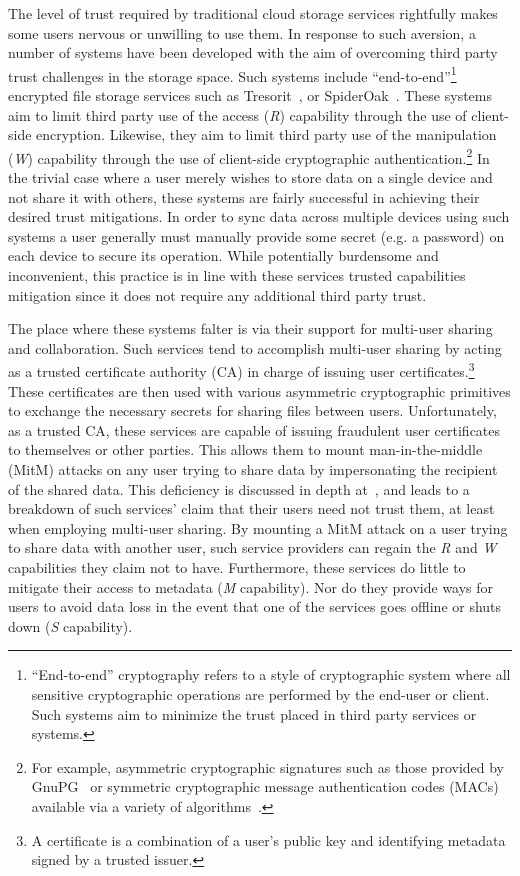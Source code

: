 The level of trust required by traditional cloud storage services
rightfully makes some users nervous or unwilling to use them. In
response to such aversion, a number of systems have been developed
with the aim of overcoming third party trust challenges in the storage
space. Such systems include ``end-to-end''\footnote{``End-to-end''
  cryptography refers to a style of cryptographic system where all
  sensitive cryptographic operations are performed by the end-user or
  client. Such systems aim to minimize the trust placed in third party
  services or systems.} encrypted file storage services such as
Tresorit~\cite{tresorit}, or SpiderOak~\cite{spideroak}. These systems
aim to limit third party use of the access (\emph{R}) capability
through the use of client-side encryption. Likewise, they aim to limit
third party use of the manipulation (\emph{W}) capability through the
use of client-side cryptographic authentication.\footnote{For example,
  asymmetric cryptographic signatures such as those provided by
  GnuPG~\cite{gnupg} or symmetric cryptographic message authentication
  codes (MACs) available via a variety of
  algorithms~\cite{dworkin2005, dworkin2008, dworkin2007}.}  In the
trivial case where a user merely wishes to store data on a single
device and not share it with others, these systems are fairly
successful in achieving their desired trust mitigations. In order to
sync data across multiple devices using such systems a user generally
must manually provide some secret (e.g. a password) on each device to
secure its operation. While potentially burdensome and inconvenient,
this practice is in line with these services trusted capabilities
mitigation since it does not require any additional third party trust.

The place where these systems falter is via their support for
multi-user sharing and collaboration. Such services tend to accomplish
multi-user sharing by acting as a trusted certificate authority (CA)
in charge of issuing user certificates.\footnote{A certificate is a
  combination of a user's public key and identifying metadata signed
  by a trusted issuer.}  These certificates are then used with various
asymmetric cryptographic primitives to exchange the necessary secrets
for sharing files between users. Unfortunately, as a trusted CA, these
services are capable of issuing fraudulent user certificates to
themselves or other parties. This allows them to mount
man-in-the-middle (MitM) attacks on any user trying to share data by
impersonating the recipient of the shared data. This deficiency is
discussed in depth at~\cite{wilson2014}, and leads to a breakdown of
such services' claim that their users need not trust them, at least
when employing multi-user sharing. By mounting a MitM attack on a user
trying to share data with another user, such service providers can
regain the \emph{R} and \emph{W} capabilities they claim not to
have. Furthermore, these services do little to mitigate their access
to metadata (\emph{M} capability). Nor do they provide ways for users
to avoid data loss in the event that one of the services goes offline
or shuts down (\emph{S} capability).

